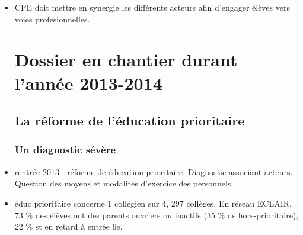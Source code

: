 \documentclass[12pt]{report}
\begin{document}
\begin{itemize}
\item CPE doit mettre en synergie les différents acteurs afin d'engager élèves vers voies profesionnelles.\\

\chapter{Dossier en chantier durant l'année 2013-2014}

\section{La réforme de l'éducation prioritaire}

\subsection{Un diagnostic sévère}

\item rentrée 2013 : réforme de éducation prioritaire. Diagnostic associant acteurs. Question des moyens et modalités d'exercice des personnels. \\

\item éduc prioritaire concerne 1 collégien sur 4, 297 collèges. En réseau ECLAIR, 73 \% des élèves ont des parents ouvriers ou inactifs (35 \% ds hors-prioritaire), 22 \% st en retard à entrée 6e.




\end{itemize}
\end{document}
